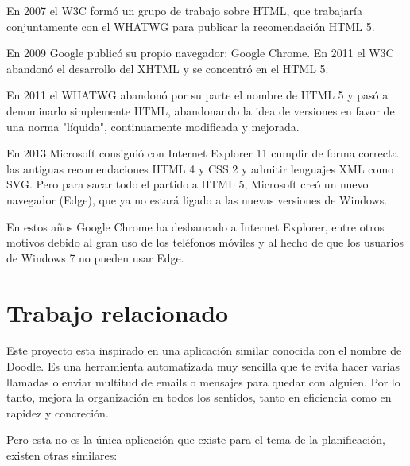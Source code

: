 \documentclass[a4paper, 12pt]{book}
\begin{document}
En 2007 el W3C form\'o un grupo de trabajo sobre HTML, que trabajar\'ia conjuntamente con el WHATWG para publicar la recomendaci\'on HTML 5.

En 2009 Google public\'o su propio navegador: Google Chrome. En 2011 el W3C abandon\'o el desarrollo del XHTML y se concentr\'o en el HTML 5.

En 2011 el WHATWG abandon\'o por su parte el nombre de HTML 5 y pas\'o a denominarlo simplemente HTML, abandonando la idea de versiones en favor de una norma "l\'iquida", continuamente modificada y mejorada.

En 2013 Microsoft consigui\'o con Internet Explorer 11 cumplir de forma correcta las antiguas recomendaciones HTML 4 y CSS 2 y admitir lenguajes XML como SVG. Pero para sacar todo el partido a HTML 5, Microsoft cre\'o un nuevo navegador (Edge), que ya no estar\'a ligado a las nuevas versiones de Windows.

En estos a\~nos Google Chrome ha desbancado a Internet Explorer, entre otros motivos debido al gran uso de los tel\'efonos m\'oviles y al hecho de que los usuarios de Windows 7 no pueden usar Edge.


\section{Trabajo relacionado}
\label{sec:seccion}

Este proyecto esta inspirado en una aplicaci\'on similar conocida con el nombre de Doodle. Es una herramienta automatizada muy sencilla que te evita hacer varias llamadas o enviar multitud de emails o mensajes para quedar con alguien. Por lo tanto, mejora la organizaci\'on en todos los sentidos, tanto en eficiencia como en rapidez y concreci\'on.

Pero esta no es la \'unica aplicaci\'on que existe para el tema de la planificaci\'on, existen otras similares:
\end{document}

